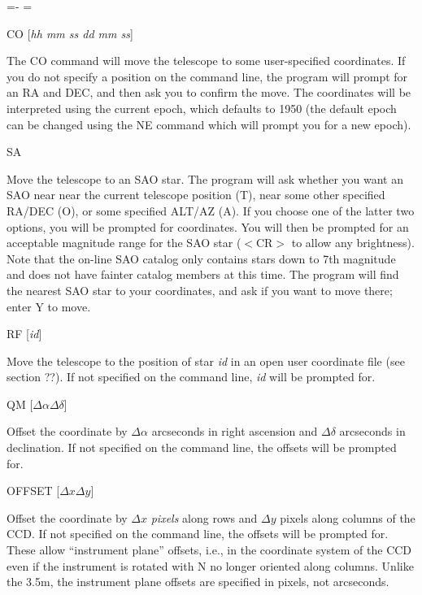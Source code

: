 \documentclass[10pt]{report}
\renewcommand{\[}{\begin{eqnarray}}
\renewcommand{\]}{\end{eqnarray}}
\newenvironment{hanging}{
	\begin{list}{}{
		\labelsep=0pt
		\labelwidth=0pt
		\listparindent=0pt
		\itemindent=-\leftmargini
		\leftmargin=\leftmargini
	}
}{
	\end{list}
}
\begin{document}
\begin{hanging}
\item {CO [{\it hh mm ss dd mm ss}]}

The CO command will move the telescope to some user-specified coordinates. 
If you do not specify a position on the command line, the program
will prompt for an RA and DEC, and then ask you to confirm the
move. The coordinates will be interpreted using the current epoch,
which defaults to 1950 (the default epoch can be changed using the
NE command which will prompt you for a new epoch).

\item{SA}

Move the telescope to an SAO star. The program will ask whether you
want an SAO near near the current telescope position (T), near
some other specified RA/DEC (O), or some specified ALT/AZ (A). If
you choose one of the latter two options, you will be prompted for
coordinates. You will then be prompted for an acceptable magnitude 
range for the SAO star ($<$CR$>$ to allow any brightness). Note that
the on-line SAO catalog only contains stars down to 7th magnitude
and does not have fainter catalog members at this time.
The program will find the nearest SAO star to your coordinates, and
ask if you want to move there; enter Y to move.

\item{RF [{\it id}]}

Move the telescope to the position of star {\it id} in an open user
coordinate file (see section ??). If not specified on the command line,
{\it id} will be prompted for.

\item{QM [{\it $\Delta\alpha \Delta\delta$}]}

Offset the coordinate by $\Delta\alpha$ arcseconds in right ascension and
$\Delta\delta$ arcseconds in declination. If not specified on the command
line, the offsets will be prompted for.

\item{OFFSET [{\it $\Delta x \Delta y$}]}

Offset the coordinate by $\Delta x$ \textit{pixels} along rows and
$\Delta y$ pixels along columns of the CCD. If not specified on the command
line, the offsets will be prompted for. These allow ``instrument plane''
offsets, i.e., in the coordinate system of the CCD even if the instrument
is rotated with N no longer oriented along columns. Unlike the 3.5m,
the instrument plane offsets are specified in pixels, not arcseconds.


\end{hanging}
\end{document}
